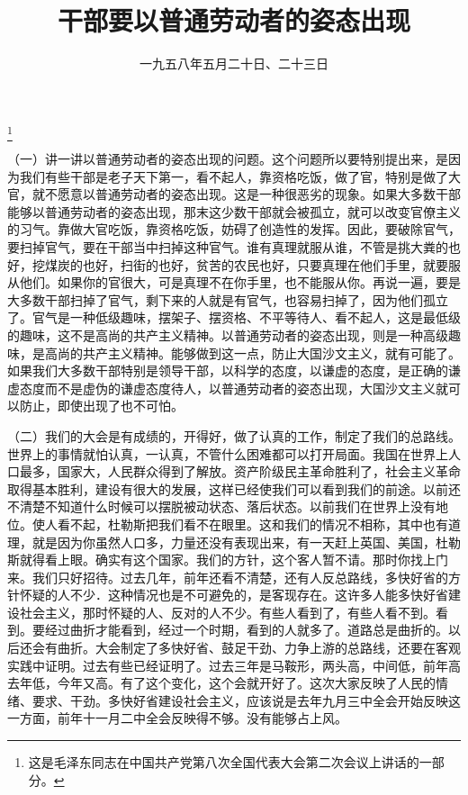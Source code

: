
\title{干部要以普通劳动者的姿态出现}
\date{一九五八年五月二十日、二十三日}
\thanks{这是毛泽东同志在中国共产党第八次全国代表大会第二次会议上讲话的一部分。}
\maketitle


（一）讲一讲以普通劳动者的姿态出现的问题。这个问题所以要特别提出来，是因为我们有些干部是老子天下第一，看不起人，靠资格吃饭，做了官，特别是做了大官，就不愿意以普通劳动者的姿态出现。这是一种很恶劣的现象。如果大多数干部能够以普通劳动者的姿态出现，那末这少数干部就会被孤立，就可以改变官僚主义的习气。靠做大官吃饭，靠资格吃饭，妨碍了创造性的发挥。因此，要破除官气，要扫掉官气，要在干部当中扫掉这种官气。谁有真理就服从谁，不管是挑大粪的也好，挖煤炭的也好，扫街的也好，贫苦的农民也好，只要真理在他们手里，就要服从他们。如果你的官很大，可是真理不在你手里，也不能服从你。再说一遍，要是大多数干部扫掉了官气，剩下来的人就是有官气，也容易扫掉了，因为他们孤立了。官气是一种低级趣味，摆架子、摆资格、不平等待人、看不起人，这是最低级的趣味，这不是高尚的共产主义精神。以普通劳动者的姿态出现，则是一种高级趣味，是高尚的共产主义精神。能够做到这一点，防止大国沙文主义，就有可能了。如果我们大多数干部特别是领导干部，以科学的态度，以谦虚的态度，是正确的谦虚态度而不是虚伪的谦虚态度待人，以普通劳动者的姿态出现，大国沙文主义就可以防止，即使出现了也不可怕。

（二）我们的大会是有成绩的，开得好，做了认真的工作，制定了我们的总路线。世界上的事情就怕认真，一认真，不管什么困难都可以打开局面。我国在世界上人口最多，国家大，人民群众得到了解放。资产阶级民主革命胜利了，社会主义革命取得基本胜利，建设有很大的发展，这样已经使我们可以看到我们的前途。以前还不清楚不知道什么时候可以摆脱被动状态、落后状态。以前我们在世界上没有地位。使人看不起，杜勒斯把我们看不在眼里。这和我们的情况不相称，其中也有道理，就是因为你虽然人口多，力量还没有表现出来，有一天赶上英国、美国，杜勒斯就得看上眼。确实有这个国家。我们的方针，这个客人暂不请。那时你找上门来。我们只好招待。过去几年，前年还看不清楚，还有人反总路线，多快好省的方针怀疑的人不少．这种情况也是不可避免的，是客现存在。这许多人能多快好省建设社会主义，那时怀疑的人、反对的人不少。有些人看到了，有些人看不到。看到。要经过曲折才能看到，经过一个时期，看到的人就多了。道路总是曲折的。以后还会有曲折。大会制定了多快好省、鼓足干劲、力争上游的总路线，还要在客观实践中证明。过去有些已经证明了。过去三年是马鞍形，两头高，中间低，前年高去年低，今年又高。有了这个变化，这个会就开好了。这次大家反映了人民的情绪、要求、干劲。多快好省建设社会主义，应该说是去年九月三中全会开始反映这一方面，前年十一月二中全会反映得不够。没有能够占上风。

